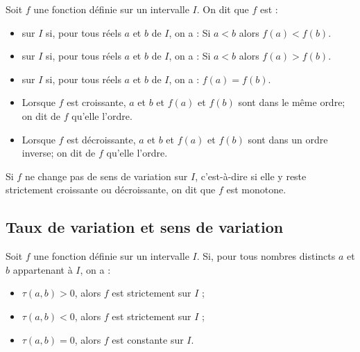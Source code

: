 \documentclass[12pt,a4paper,french]{book}
\begin{document}
\begin{defn}[Monotonie]
Soit \( f \) une fonction définie sur un intervalle \( I \). On dit que \( f \) est :
\begin{itemize}
    \item \textbf{} sur \( I \) si, pour tous réels \( a \) et \( b \) de \( I \), on a : Si \( a < b \) alors \( f(a) < f(b) \).
    \item \textbf{} sur \( I \) si, pour tous réels \( a \) et \( b \) de \( I \), on a : Si \( a < b \) alors \( f(a) > f(b) \).
    \item \textbf{} sur \( I \) si, pour tous réels \( a \) et \( b \) de \( I \), on a : \( f(a) = f(b) \).
\end{itemize}
\end{defn}

\begin{rem}
\begin{itemize}
\item Lorsque \( f \) est croissante, \( a \) et \( b \) et \( f(a) \) et \( f(b) \) sont dans le même ordre; on dit de \( f \) qu’elle  l’ordre. \item Lorsque \( f \) est décroissante, \( a \) et \( b \) et \( f(a) \) et \( f(b) \) sont dans un ordre inverse; on dit de \( f \) qu’elle  l’ordre.
\end{itemize}
\end{rem}

\begin{defn}
Si \( f \) ne change pas de sens de variation sur \( I \), c’est-à-dire si elle y reste strictement croissante ou décroissante, on dit que \( f \) est monotone.
\end{defn}

\subsection{Taux de variation et sens de variation}

\begin{prop}
Soit \( f \) une fonction définie sur un intervalle \( I \). Si, pour tous nombres distincts \( a \) et \( b \) appartenant à \( I \), on a :
\begin{itemize}
    \item \( \tau(a, b) > 0 \), alors \( f \) est strictement  sur \( I \) ;
    \item \( \tau(a, b) < 0 \), alors \( f \) est strictement  sur \( I \) ;
    \item \( \tau(a, b) = 0 \), alors \( f \) est constante sur \( I \).
\end{itemize}
\end{prop}
\end{document}
